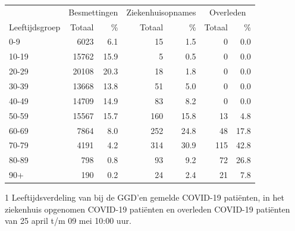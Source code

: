 \documentclass[
  english,
  man,floatsintext]{apa6}
\begin{document}
\begin{table}
\centering\begingroup\fontsize{11}{13}\selectfont

\begin{threeparttable}
\begin{tabular}{lrrrrrr}
\toprule
\multicolumn{1}{c}{ } & \multicolumn{2}{c}{Besmettingen} & \multicolumn{2}{c}{Ziekenhuisopnames} & \multicolumn{2}{c}{Overleden} \\
\cmidrule(l{3pt}r{3pt}){2-3} \cmidrule(l{3pt}r{3pt}){4-5} \cmidrule(l{3pt}r{3pt}){6-7}
Leeftijdsgroep & Totaal & \% & Totaal & \% & Totaal & \%\\
\midrule
0-9 & 6023 & 6.1 & 15 & 1.5 & 0 & 0.0\\
10-19 & 15762 & 15.9 & 5 & 0.5 & 0 & 0.0\\
20-29 & 20108 & 20.3 & 18 & 1.8 & 0 & 0.0\\
30-39 & 13668 & 13.8 & 51 & 5.0 & 0 & 0.0\\
40-49 & 14709 & 14.9 & 83 & 8.2 & 0 & 0.0\\
50-59 & 15567 & 15.7 & 160 & 15.8 & 13 & 4.8\\
60-69 & 7864 & 8.0 & 252 & 24.8 & 48 & 17.8\\
70-79 & 4191 & 4.2 & 314 & 30.9 & 115 & 42.8\\
80-89 & 798 & 0.8 & 93 & 9.2 & 72 & 26.8\\
90+ & 190 & 0.2 & 24 & 2.4 & 21 & 7.8\\
\bottomrule
\end{tabular}
\begin{tablenotes}
\item[1] Leeftijdsverdeling van bij de GGD’en gemelde COVID-19 patiënten, in het ziekenhuis opgenomen COVID-19 patiënten en overleden COVID-19 patiënten van 25 april t/m 09 mei 10:00 uur.
\end{tablenotes}
\end{threeparttable}
\endgroup{}
\end{table}

\newpage
\end{document}
